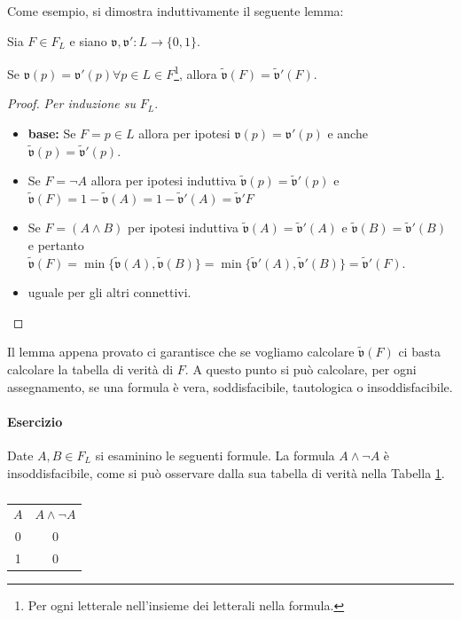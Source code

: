 Come esempio, si dimostra induttivamente il seguente lemma: 
\begin{lem}
Sia $F \in F_L$ e siano $\mathfrak{v}, \mathfrak{v}' : L \rightarrow \{0,1\}$. 

Se $\mathfrak{v}(p) = \mathfrak{v}'(p) \forall p \in L \in F$\footnote{Per ogni letterale nell'insieme dei letterali nella formula.}, 
allora $\widetilde{\mathfrak{v}}(F) = \widetilde{\mathfrak{v}}'(F)$.
\end{lem}
\begin{proof}
  \textit{Per induzione su } $F_L$.
  \begin{itemize}
    \item \textbf{base:} Se $F = p \in L$ allora per ipotesi $\mathfrak{v}(p) = \mathfrak{v}'(p)$ e 
      anche $\widetilde{\mathfrak{v}}(p) = \widetilde{\mathfrak{v}}'(p)$.
    \item Se $F = \neg A$ allora per ipotesi induttiva 
      $\widetilde{\mathfrak{v}}(p) = \widetilde{\mathfrak{v}}'(p)$ e $\widetilde{\mathfrak{v}}(F) = 1 - 
      \widetilde{\mathfrak{v}}(A) = 1 - \widetilde{\mathfrak{v}}'(A) = \widetilde{\mathfrak{v}}'{F}$
    \item Se $F = (A \land B)$ per ipotesi induttiva $\widetilde{\mathfrak{v}}(A) = \widetilde{\mathfrak{v}}'(A)$ 
      e $\widetilde{\mathfrak{v}}(B) = \widetilde{\mathfrak{v}}'(B)$ e pertanto 
      $\widetilde{\mathfrak{v}}(F) = \min\{\widetilde{\mathfrak{v}}(A), \widetilde{\mathfrak{v}}(B)\} = 
      \min\{\widetilde{\mathfrak{v}}'(A), \widetilde{\mathfrak{v}}'(B)\} = \widetilde{\mathfrak{v}}'(F)$.
    \item uguale per gli altri connettivi.
  \end{itemize}
\end{proof}
Il lemma appena provato ci garantisce che se vogliamo calcolare $\widetilde{\mathfrak{v}}(F)$ 
ci basta calcolare la tabella di verità di $F$. A questo punto si può calcolare, 
per ogni assegnamento, se una formula è vera, soddisfacibile, tautologica o 
insoddisfacibile.

\paragraph{Esercizio}
Date $A, B \in F_L$ si esaminino le seguenti formule. 
La formula $A \land \neg A$ è insoddisfacibile, come si può osservare dalla 
sua tabella di verità nella Tabella \ref{table:insodd}.
\begin{table}[!h]
  \centering
  \begin{tabular}{|c|c|}
  \hline
  $A$ & $A \land \neg A$ \\
   0  &   0        \\ 
   1  &  0         \\
   \hline
 \end{tabular}
 \caption{}
 \label{table:insodd}
\end{table}

